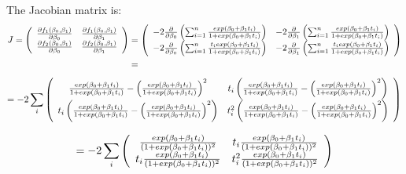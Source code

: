 \documentclass[12pt]{article}
\begin{document}
\begin{enumerate}[(a)]
The Jacobian matrix is:
\begin{align*}
J =
\left( {\begin{array}{*{20}c}
\frac{\partial f_1(\beta_0, \beta_1) }{\partial \beta_0}&\frac{\partial f_1(\beta_0, \beta_1) }{\partial \beta_1}\\
\frac{\partial f_2(\beta_0, \beta_1) }{\partial \beta_0}&\frac{\partial f_2(\beta_0, \beta_1) } {\partial \beta_1}\\
 \end{array} } \right) &=
\left( {\begin{array}{*{20}c}
 - 2 \frac{\partial  }{\partial \beta_0} \left(\sum_{i=1}^n \frac{ exp(\beta_0 + \beta_1 t_i) } {1 + exp(\beta_0 + \beta_1 t_i) } \right) & - 2 \frac{\partial }{\partial \beta_1} \left(\sum_{i=1}^n \frac{ exp(\beta_0 + \beta_1 t_i) } {1 + exp(\beta_0 + \beta_1 t_i) } \right) \\
- 2 \frac{\partial  }{\partial \beta_0} \left( \sum_{i=1}^n \frac{ t_i exp(\beta_0 + \beta_1 t_i) } {1 + exp(\beta_0 + \beta_1 t_i) } \right) & - 2 \frac{\partial  } {\partial \beta_1}  \left( \sum_{i=1}^n \frac{ t_i exp(\beta_0 + \beta_1 t_i) } {1 + exp(\beta_0 + \beta_1 t_i) } \right) \\
 \end{array} } \right)  \\ &= 
 \end{align*}
 \begin{align*}
 = -2 \sum_i
\left( {\begin{array}{*{20}c}
\frac{ exp(\beta_0 + \beta_1 t_i) } {1 + exp(\beta_0 + \beta_1 t_i) } - \left(  \frac{ exp(\beta_0 + \beta_1 t_i) } {1 + exp(\beta_0 + \beta_1 t_i) }\right)^2    & t_i \left(\frac{ exp(\beta_0 + \beta_1 t_i) } {1 + exp(\beta_0 + \beta_1 t_i) } - \left(  \frac{ exp(\beta_0 + \beta_1 t_i) } {1 + exp(\beta_0 + \beta_1 t_i) }\right)^2\right)\\
t_i \left(\frac{ exp(\beta_0 + \beta_1 t_i) } {1 + exp(\beta_0 + \beta_1 t_i) } - \left(  \frac{ exp(\beta_0 + \beta_1 t_i) } {1 + exp(\beta_0 + \beta_1 t_i) }\right)^2\right) & t_i^2 \left(\frac{ exp(\beta_0 + \beta_1 t_i) } {1 + exp(\beta_0 + \beta_1 t_i) } - \left(  \frac{ exp(\beta_0 + \beta_1 t_i) } {1 + exp(\beta_0 + \beta_1 t_i) }\right)^2\right)\\
 \end{array} } \right)
\end{align*}

 \begin{align*}
 = -2 \sum_i
\left( {\begin{array}{*{20}c}
\frac{exp(\beta_0 + \beta_1 t_i) } { (1 + exp(\beta_0 + \beta_1 t_i))^2 } & t_i \frac{exp(\beta_0 + \beta_1 t_i) } { (1 + exp(\beta_0 + \beta_1 t_i))^2 }\\
t_i \frac{exp(\beta_0 + \beta_1 t_i) } { (1 + exp(\beta_0 + \beta_1 t_i))^2 } & t_i^2 \frac{exp(\beta_0 + \beta_1 t_i) } { (1 + exp(\beta_0 + \beta_1 t_i))^2 }\\
 \end{array} } \right)
\end{align*}







\end{enumerate}
\end{document}
